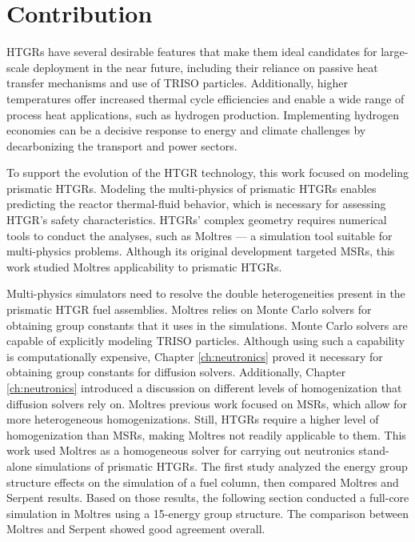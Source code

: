 \section{Contribution}

HTGRs have several desirable features that make them ideal candidates for large-scale deployment in the near future, including their reliance on passive heat transfer mechanisms and use of TRISO particles.
Additionally, higher temperatures offer increased thermal cycle efficiencies and enable a wide range of process heat applications, such as hydrogen production.
Implementing hydrogen economies can be a decisive response to energy and climate challenges by decarbonizing the transport and power sectors.

To support the evolution of the HTGR technology, this work focused on modeling prismatic HTGRs.
Modeling the multi-physics of prismatic HTGRs enables predicting the reactor thermal-fluid behavior, which is necessary for assessing HTGR's safety characteristics.
HTGRs' complex geometry requires numerical tools to conduct the analyses, such as Moltres --- a simulation tool suitable for multi-physics problems.
Although its original development targeted MSRs, this work studied Moltres applicability to prismatic HTGRs.

Multi-physics simulators need to resolve the double heterogeneities present in the prismatic HTGR fuel assemblies.
Moltres relies on Monte Carlo solvers for obtaining group constants that it uses in the simulations.
Monte Carlo solvers are capable of explicitly modeling TRISO particles.
Although using such a capability is computationally expensive, Chapter \ref{ch:neutronics} proved it necessary for obtaining group constants for diffusion solvers.
Additionally, Chapter \ref{ch:neutronics} introduced a discussion on different levels of homogenization that diffusion solvers rely on.
Moltres previous work focused on MSRs, which allow for more heterogeneous homogenizations.
Still, HTGRs require a higher level of homogenization than MSRs, making Moltres not readily applicable to them.
This work used Moltres as a homogeneous solver for carrying out neutronics stand-alone simulations of prismatic HTGRs.
The first study analyzed the energy group structure effects on the simulation of a fuel column, then compared Moltres and Serpent results.
Based on those results, the following section conducted a full-core simulation in Moltres using a 15-energy group structure.
The comparison between Moltres and Serpent showed good agreement overall.

